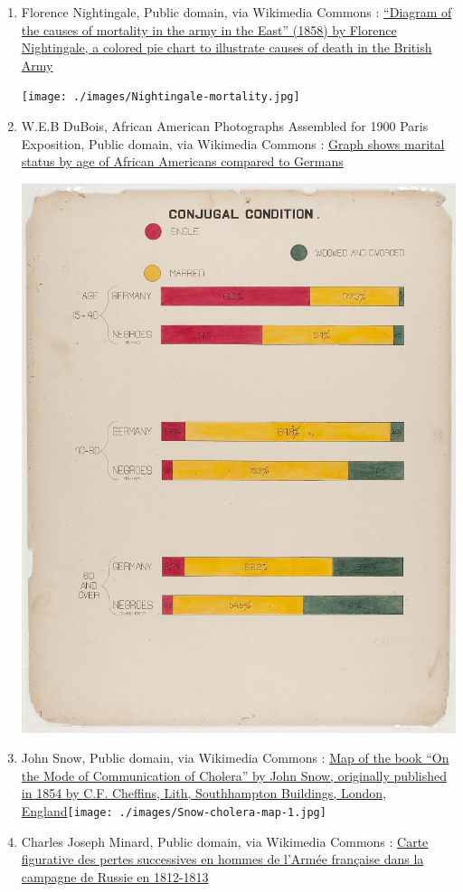 \documentclass[
  letterpaper,
  DIV=11,
  numbers=noendperiod]{scrreprt}
\begin{document}
\begin{enumerate}
\def\labelenumi{\arabic{enumi}.}
\item
  Florence Nightingale, Public domain, via Wikimedia Commons :
  \href{https://upload.wikimedia.org/wikipedia/commons/1/17/Nightingale-mortality.jpg}{``Diagram
  of the causes of mortality in the army in the East'' (1858) by
  Florence Nightingale, a colored pie chart to illustrate causes of
  death in the British Army}

  \texttt{[image: ./images/Nightingale-mortality.jpg]}
\item
  W.E.B DuBois, African American Photographs Assembled for 1900 Paris
  Exposition, Public domain, via Wikimedia Commons :
  \href{https://commons.wikimedia.org/wiki/File:The_Georgia_Negro_LCCN2013650429.jpg}{Graph
  shows marital status by age of African Americans compared to Germans}

  \includegraphics{./images/The_Georgia_Negro_LCCN2013650429.jpg}
\item
  John Snow, Public domain, via Wikimedia Commons :
  \href{https://en.wikipedia.org/wiki/File:Snow-cholera-map-1.jpg\#/media/File:Snow-cholera-map-1.jpg}{Map
  of the book ``On the Mode of Communication of Cholera'' by John Snow,
  originally published in 1854 by C.F. Cheffins, Lith, Southhampton
  Buildings, London,
  England}\texttt{[image: ./images/Snow-cholera-map-1.jpg]}
\item
  Charles Joseph Minard, Public domain, via Wikimedia Commons :
  \href{https://commons.wikimedia.org/wiki/File:Minard.png\#/media/Fichier:Minard.png}{Carte
  figurative des pertes successives en hommes de l'Armée française dans
  la campagne de Russie en 1812-1813}


\end{enumerate}
\end{document}
